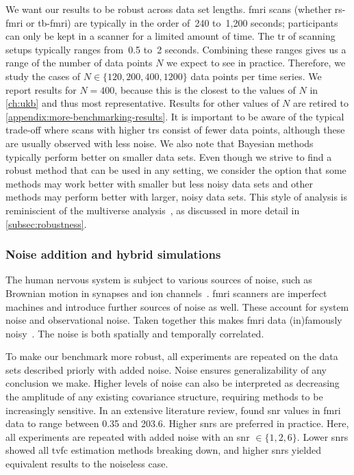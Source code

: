 We want our results to be robust across data set lengths.
\gls{fmri} scans (whether \gls{rs-fmri} or \gls{tb-fmri}) are typically in the order of~240 to~1,200 seconds; participants can only be kept in a scanner for a limited amount of time.
The \gls{tr} of scanning setups typically ranges from~0.5 to~2 seconds.
Combining these ranges gives us a range of the number of data points $N$ we expect to see in practice.
Therefore, we study the cases of $N \in \{120, 200, 400, 1200\}$ data points per time series.
We report results for $N = 400$, because this is the closest to the values of $N$ in \cref{ch:ukb} and thus most representative.
Results for other values of $N$ are retired to \cref{appendix:more-benchmarking-results}.
It is important to be aware of the typical trade-off where scans with higher \glspl{tr} consist of fewer data points, although these are usually observed with less noise.
We also note that Bayesian methods typically perform better on smaller data sets.
Even though we strive to find a robust method that can be used in any setting, we consider the option that some methods may work better with smaller but less noisy data sets and other methods may perform better with larger, noisy data sets.
This style of analysis is reminiscient of the multiverse analysis~\parencite{Steegen2016}, as discussed in more detail in \cref{subsec:robustness}.

\subsubsection{Noise addition and hybrid simulations}

The human nervous system is subject to various sources of noise, such as Brownian motion in synapses and ion channels~\parencite{Faisal2008}.
\gls{fmri} scanners are imperfect machines and introduce further sources of noise as well.
These account for system noise and observational noise.
Taken together this makes \gls{fmri} data (in)famously noisy~\parencite[see also][for analysis and biophysical simulations of impact of noise and delay]{Deco2009}.
The noise is both spatially and temporally correlated.

To make our benchmark more robust, all experiments are repeated on the data sets described priorly with added noise.
Noise ensures generalizability of any conclusion we make.
Higher levels of noise can also be interpreted as decreasing the amplitude of any existing covariance structure, requiring methods to be increasingly sensitive.
In an extensive literature review, \textcite{Welvaert2013} found \gls{snr} values in \gls{fmri} data to range between 0.35 and 203.6.
Higher \glspl{snr} are preferred in practice.
%
Here, all experiments are repeated with added noise with an \gls{snr} $\in \{1, 2, 6\}$.
Lower \glspl{snr} showed all \gls{tvfc} estimation methods breaking down, and higher \glspl{snr} yielded equivalent results to the noiseless case.

